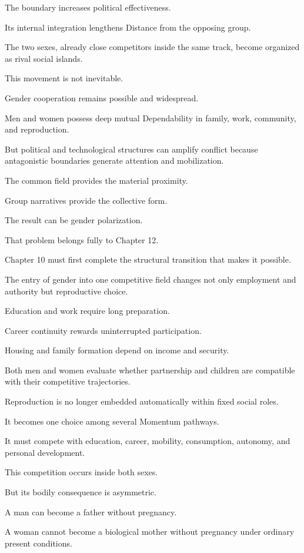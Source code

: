 The boundary increases political effectiveness.

Its internal integration lengthens Distance from the opposing group.

The two sexes, already close competitors inside the same track, become organized as rival social islands.

This movement is not inevitable.

Gender cooperation remains possible and widespread.

Men and women possess deep mutual Dependability in family, work, community, and reproduction.

But political and technological structures can amplify conflict because antagonistic boundaries generate attention and mobilization.

The common field provides the material proximity.

Group narratives provide the collective form.

The result can be gender polarization.

That problem belongs fully to Chapter 12.

Chapter 10 must first complete the structural transition that makes it possible.

The entry of gender into one competitive field changes not only employment and authority but reproductive choice.

Education and work require long preparation.

Career continuity rewards uninterrupted participation.

Housing and family formation depend on income and security.

Both men and women evaluate whether partnership and children are compatible with their competitive trajectories.

Reproduction is no longer embedded automatically within fixed social roles.

It becomes one choice among several Momentum pathways.

It must compete with education, career, mobility, consumption, autonomy, and personal development.

This competition occurs inside both sexes.

But its bodily consequence is asymmetric.

A man can become a father without pregnancy.

A woman cannot become a biological mother without pregnancy under ordinary present conditions.

